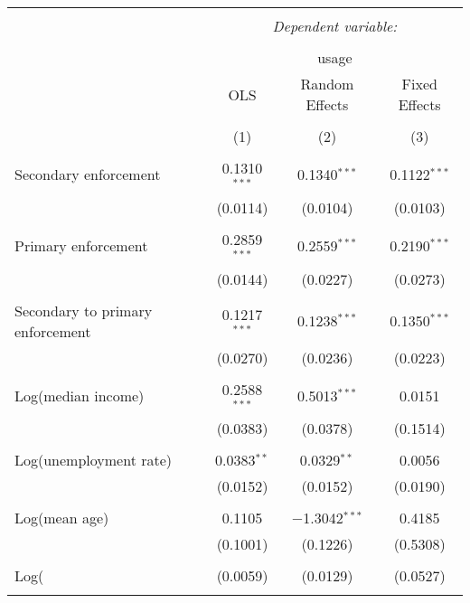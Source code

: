 
\begin{table}[!htbp] \centering 
  \caption{} 
  \label{} 
\begin{tabular}{@{\extracolsep{5pt}}lccc} 
\\[-1.8ex]\hline 
\hline \\[-1.8ex] 
 & \multicolumn{3}{c}{\textit{Dependent variable:}} \\ 
\cline{2-4} 
\\[-1.8ex] & \multicolumn{3}{c}{usage} \\ 
 & OLS & Random Effects & Fixed Effects \\ 
\\[-1.8ex] & (1) & (2) & (3)\\ 
\hline \\[-1.8ex] 
 Secondary enforcement & 0.1310$^{***}$ & 0.1340$^{***}$ & 0.1122$^{***}$ \\ 
  & (0.0114) & (0.0104) & (0.0103) \\ 
  & & & \\ 
 Primary enforcement & 0.2859$^{***}$ & 0.2559$^{***}$ & 0.2190$^{***}$ \\ 
  & (0.0144) & (0.0227) & (0.0273) \\ 
  & & & \\ 
 Secondary to primary enforcement & 0.1217$^{***}$ & 0.1238$^{***}$ & 0.1350$^{***}$ \\ 
  & (0.0270) & (0.0236) & (0.0223) \\ 
  & & & \\ 
 Log(median income) & 0.2588$^{***}$ & 0.5013$^{***}$ & 0.0151 \\ 
  & (0.0383) & (0.0378) & (0.1514) \\ 
  & & & \\ 
 Log(unemployment rate) & 0.0383$^{**}$ & 0.0329$^{**}$ & 0.0056 \\ 
  & (0.0152) & (0.0152) & (0.0190) \\ 
  & & & \\ 
 Log(mean age) & 0.1105 & $-$1.3042$^{***}$ & 0.4185 \\ 
  & (0.1001) & (0.1226) & (0.5308) \\ 
  & & & \\ 
 Log(%
  & (0.0059) & (0.0129) & (0.0527) \\ 
  & & & \\ 

\end{tabular}
\end{table}
